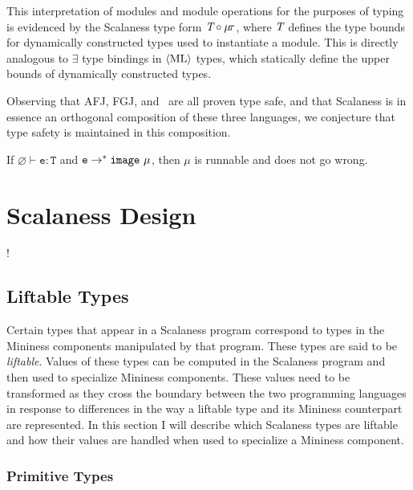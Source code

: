 This interpretation of modules and module operations for the purposes of typing is evidenced by
the Scalaness type form $\textit{T} \circ \mu\!\tau$, where $\textit{T}$ defines the type bounds
for dynamically constructed types used to instantiate a module. This is directly analogous to
$\exists$ type bindings in $\langle \text{ML} \rangle$ types, which statically define the upper bounds of dynamically
constructed types.

Observing that AFJ, FGJ, and \fml\ are all proven type safe, and that Scalaness is in essence an
orthogonal composition of these three languages, we conjecture that type safety is maintained in
this composition.

\begin{conject}
  If $\varnothing \vdash \texttt{e} : \texttt{T}$ and $\texttt{e} \rightarrow^* \mathtt{image}\ \mu$,
  then $\mu$ is runnable and does not go wrong.
\end{conject}


\section{Scalaness Design}
\label{section-scalaness-design}

\lstset{language=scalaness}
\lstMakeShortInline!

\subsection{Liftable Types}
\label{section-liftable-types-design}

Certain types that appear in a Scalaness program correspond to types in the Mininess components
manipulated by that program. These types are said to be \textit{liftable}. Values of these types
can be computed in the Scalaness program and then used to specialize Mininess components. These
values need to be transformed as they cross the boundary between the two programming languages
in response to differences in the way a liftable type and its Mininess counterpart are
represented. In this section I will describe which Scalaness types are liftable and how their
values are handled when used to specialize a Mininess component.

\subsubsection{Primitive Types}
\label{section-primitive-types-design}

